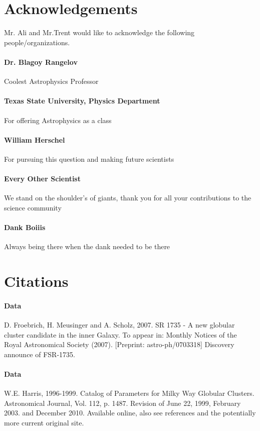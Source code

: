 \documentclass[%
 reprint,
 amsmath,amssymb,
 aps,
]{revtex4-1}
\begin{document}
\section{\label{sec:level6}Acknowledgements}
Mr. Ali and Mr.Trent would like to acknowledge the following people/organizations.

\paragraph{Dr. Blagoy Rangelov}
Coolest Astrophysics Professor
\paragraph{Texas State University, Physics Department}
For offering Astrophysics as a class
\paragraph{William Herschel}
For pursuing this question and making future scientists
\paragraph{Every Other Scientist}
We stand on the shoulder's of giants, thank you for all your contributions to the science community
\paragraph{Dank Boiiis}
Always being there when the dank needed to be there

\section{\label{sec:level7}Citations}

\paragraph{Data}
D. Froebrich, H. Meusinger and A. Scholz, 2007. SR 1735 - A new globular cluster candidate in the inner Galaxy. To appear in: Monthly Notices of the Royal Astronomical Society (2007). [Preprint: astro-ph/0703318] Discovery announce of FSR-1735.
\paragraph{Data}
W.E. Harris, 1996-1999. Catalog of Parameters for Milky Way Globular Clusters. Astronomical Journal, Vol. 112, p. 1487. Revision of June 22, 1999, February 2003. and December 2010. Available online, also see references and the potentially more current original site.
\end{document}
